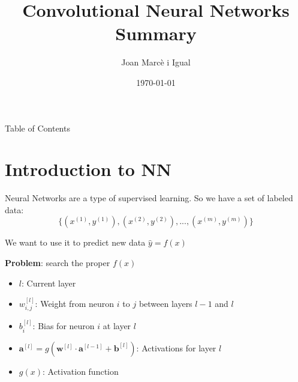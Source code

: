 \documentclass{beamer}
\title{Convolutional Neural Networks Summary}
\date{\today}
\author[Joan]{Joan Marcè i Igual}
\institute[UHN]{University Health Network}
\begin{document}
\begin{frame}
	\titlepage
\end{frame}
\begin{frame}{Table of Contents}
	\tableofcontents
\end{frame}

\section{Introduction to NN}
\begin{frame}{\secname}
	Neural Networks are a type of supervised learning. So we have a set of labeled data:
	$$\{(x^{(1)}, y^{(1)}), (x^{(2)}, y^{(2)}), ..., (x^{(m)}, y^{(m)})\}$$
	
	We want to use it to predict new data $\hat{y} = f(x)$
	
	\textbf{Problem}: search the proper $f(x)$
\end{frame}
\begin{frame}
	
\end{frame}
\begin{frame}
    \begin{itemize}
        \item $l$: Current layer
        \item $w_{i, j}^{[l]}$: Weight from neuron $i$ to $j$ between layers $l - 1$ and $l$
        \item $b_{i}^{[l]}$: Bias for neuron $i$ at layer $l$
        \item $\bm{a}^{[l]} = g(\bm{w}^{[l]}\cdot \bm{a}^{[l - 1]} + \bm{b}^{[l]})$: Activations for layer $l$
        \item $g(x)$: Activation function
    \end{itemize}
    
\end{frame}
\end{document}
